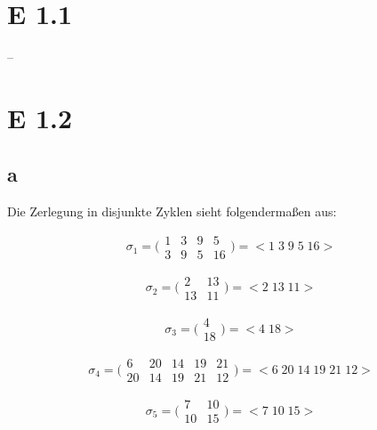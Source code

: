 \documentclass[12pt]{article}
\begin{document}
\section{E 1.1}
--

\section{E 1.2}
\subsection{a}
Die Zerlegung in disjunkte Zyklen sieht folgendermaßen aus:

\begin{equation}
\sigma_1 =
\bigl(\begin{smallmatrix}
1 & 3 & 9 & 5  \\
3 & 9 & 5 & 16 
\end{smallmatrix}\bigr) = \bigl  < 1 \; 3\; 9\; 5\; 16 \bigr >
\end{equation}

\begin{equation}
\sigma_2 =
\bigl(\begin{smallmatrix}
2  & 13 \\
13 & 11
\end{smallmatrix}\bigr) = \bigl < 2\; 13\; 11 \bigr >
\end{equation}

\begin{equation}
\sigma_3 =
\bigl(\begin{smallmatrix}
4  \\
18
\end{smallmatrix}\bigr) = \bigl < 4\; 18 \bigr >
\end{equation}

\begin{equation}
\sigma_4 =
\bigl(\begin{smallmatrix}
6  & 20 & 14 & 19 & 21\\
20 & 14 & 19 & 21 & 12
\end{smallmatrix}\bigr) = \bigl < 6 \; 20\; 14\; 19\; 21\; 12 \bigr >
\end{equation}

\begin{equation}
\sigma_5 =
\bigl(\begin{smallmatrix}
7  & 10 \\
10 & 15
\end{smallmatrix}\bigr) = \bigl < 7\; 10\; 15 \bigr >
\end{equation}
\end{document}
